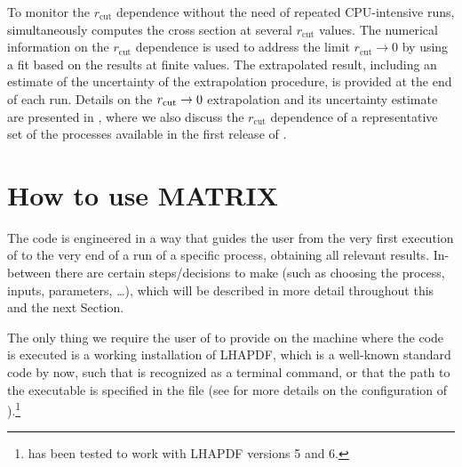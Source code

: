 \documentclass[english,11pt]{article}
\begin{document}
To monitor the $r_{\mathrm{cut}}$ dependence without the need of repeated CPU-intensive runs,
\Matrix{} simultaneously computes the cross section at several $r_{\mathrm{cut}}$ values.
The numerical information on the $r_{\mathrm{cut}}$ dependence is used to address the limit $r_{\mathrm{cut}}\to0$ by using a fit based on the results at finite \rcut{} values. 
The extrapolated result, including an estimate of the uncertainty of the extrapolation 
procedure, is provided at the end of each run.
Details on the $r_{\mathrm{cut}}{}\rightarrow 0$ extrapolation and its uncertainty estimate
are presented in , where we also discuss the 
$r_{\mathrm{cut}}$ dependence of a representative set of the processes available in the 
first release of \Matrix{}.



\section[How to use M{\scriptsize ATRIX}]{How to use M{\small ATRIX}}\label{sec:use}

The code is engineered in a way that guides the user from the very first execution of 
\Matrix{} to the very end of a run of a specific process, obtaining all relevant results.
In-between there are certain steps/decisions to make (such as choosing the process, 
inputs, parameters, \ldots), which will be described in more detail throughout this and the next Section.

The only thing we require the user of \Matrix{} to provide on the machine where the code 
is executed is a working installation of {\sc LHAPDF}, which is a well-known standard code 
by now, such that  is recognized as a terminal command, or that the path to the 
executable is specified in the file  (see  for more details on the configuration 
of \Matrix{}).\footnote{\Matrix{} has been tested to work with {\sc LHAPDF} versions 5 and 6.}

%

%
\end{document}
